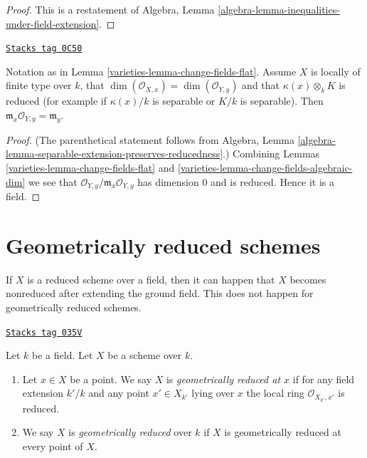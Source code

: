 \begin{proof}
This is a restatement of Algebra, Lemma
\ref{algebra-lemma-inequalities-under-field-extension}.
\end{proof}

\begin{lemma}
\label{varieties-lemma-change-fields-algebraic-unramified}
\href{https://stacks.math.columbia.edu/tag/0C50}{\texttt{Stacks tag 0C50}}

Notation as in Lemma \ref{varieties-lemma-change-fields-flat}.
Assume $X$ is locally of finite type over $k$,
that $\dim(\mathcal{O}_{X, x}) = \dim(\mathcal{O}_{Y, y})$
and that $\kappa(x) \otimes_k K$ is reduced
(for example if $\kappa(x)/k$ is separable or $K/k$ is separable).
Then $\mathfrak m_x \mathcal{O}_{Y, y} = \mathfrak m_y$.
\end{lemma}

\begin{proof}

(The parenthetical statement follows from
Algebra, Lemma \ref{algebra-lemma-separable-extension-preserves-reducedness}.)
Combining Lemmas \ref{varieties-lemma-change-fields-flat} and
\ref{varieties-lemma-change-fields-algebraic-dim}
we see that $\mathcal{O}_{Y, y}/\mathfrak m_x \mathcal{O}_{Y, y}$
has dimension $0$ and is reduced. Hence it is a field.
\end{proof}

\section{Geometrically reduced schemes}
\label{varieties-section-geometrically-reduced}
If $X$ is a reduced scheme over a field, then it can happen that $X$
becomes nonreduced after extending the ground field. This does not happen
for geometrically reduced schemes.

\begin{definition}
\label{varieties-definition-geometrically-reduced}
\href{https://stacks.math.columbia.edu/tag/035V}{\texttt{Stacks tag 035V}}

Let $k$ be a field.
Let $X$ be a scheme over $k$.
\begin{enumerate}
\item Let $x \in X$ be a point.
We say $X$ is {\it geometrically reduced at $x$}
if for any field extension $k'/k$
and any point $x' \in X_{k'}$ lying over $x$
the local ring $\mathcal{O}_{X_{k'}, x'}$ is reduced.
\item We say $X$ is {\it geometrically reduced} over $k$
if $X$ is geometrically reduced at every point of $X$.
\end{enumerate}
\end{definition}

